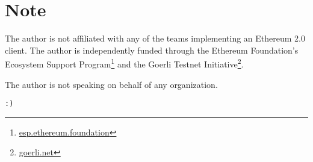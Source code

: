 \documentclass[twoside,twocolumn]{article}
\begin{document}


\vspace{\fill}

\section*{Note}
The author is not affiliated with any of the teams implementing an Ethereum 2.0 client. The author is independently funded through the Ethereum Foundation's Ecosystem Support Program\footnote{\href{https://esp.ethereum.foundation}{esp.ethereum.foundation}} and the Goerli Testnet Initiative\footnote{\href{https://goerli.net}{goerli.net}}.\par

The author is not speaking on behalf of any organization.\par

\texttt{:)}
\end{document}

